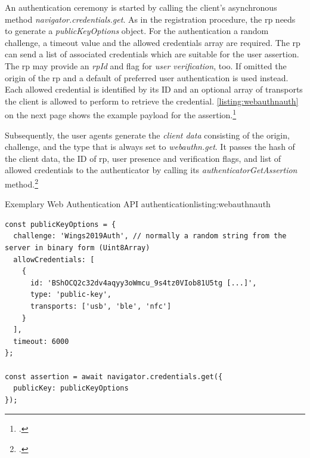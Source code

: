 An authentication ceremony is started by calling the client's asynchronous method \textit{navigator.credentials.get}. As in the registration procedure, the \gls{rp} needs to generate a \textit{publicKeyOptions} object. For the authentication a random challenge, a timeout value and the allowed credentials array are required. The \gls{rp} can send a list of associated credentials which are suitable for the user assertion. The \gls{rp} may provide an \textit{rpId} and flag for \textit{user verification}, too. If omitted the origin of the \gls{rp} and a default of preferred user authentication is used instead. Each allowed credential is identified by its ID and an optional array of transports the client is allowed to perform to retrieve the credential. \autoref{listing:webauthnauth} on the next page shows the example payload for the assertion.\footcites[See][Chapter 5.1.4., 5.5, 5.10.3.]{w3c}

Subsequently, the user agents generate the \textit{client data} consisting of the origin, challenge, and the type that is always set to \textit{webauthn.get}. It passes the hash of the client data, the ID of \gls{rp}, user presence and verification flags, and list of allowed credentials to the authenticator by calling its \textit{authenticatorGetAssertion} method.\footcites[See][Chapter 6.3.3]{w3c}
\\
\begin{example}{Exemplary Web Authentication API authentication}{listing:webauthnauth}
\begin{verbatim}
const publicKeyOptions = {
  challenge: 'Wings2019Auth', // normally a random string from the server in binary form (Uint8Array)
  allowCredentials: [
    {
      id: 'BShOCQ2c32dv4aqyy3oWmcu_9s4tz0VIob81U5tg [...]',
      type: 'public-key',
      transports: ['usb', 'ble', 'nfc']
    }
  ],
  timeout: 6000
};

const assertion = await navigator.credentials.get({
  publicKey: publicKeyOptions
});
\end{verbatim}
\end{example}


